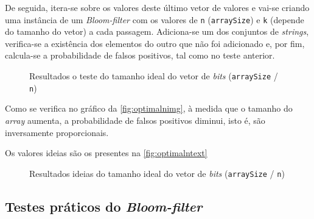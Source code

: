 \documentclass[a4paper,11pt,openright,oneside]{report}
\begin{document}
De seguida, itera-se sobre os valores deste último vetor de valores e vai-se criando uma instância de um \textit{Bloom-filter} com os valores de \texttt{n} (\texttt{arraySize}) e \texttt{k} (depende do tamanho do vetor) a cada passagem. Adiciona-se um dos conjuntos de \textit{strings}, verifica-se a existência dos elementos do outro que não foi adicionado e, por fim, calcula-se a probabilidade de falsos positivos, tal como no teste anterior.

\begin{figure}[ht]	
\center
{}
\caption{Resultados o teste do tamanho ideal do vetor de \textit{bits} (\texttt{arraySize} / \texttt{n})}
\label{fig:optimalnimg}
\end{figure}

Como se verifica no gráfico da \autoref{fig:optimalnimg}, à medida que o tamanho do \textit{array} aumenta, a probabilidade de falsos positivos diminui, isto é, são inversamente proporcionais.

Os valores ideias são os presentes na \autoref{fig:optimalntext}

\begin{figure}[ht]	
\center
{}
\caption{Resultados ideias do tamanho ideal do vetor de \textit{bits} (\texttt{arraySize} / \texttt{n})}
\label{fig:optimalntext}
\end{figure}

\subsection{Testes práticos do \textit{Bloom-filter}}
\label{subsec.testebloom}
\end{document}
